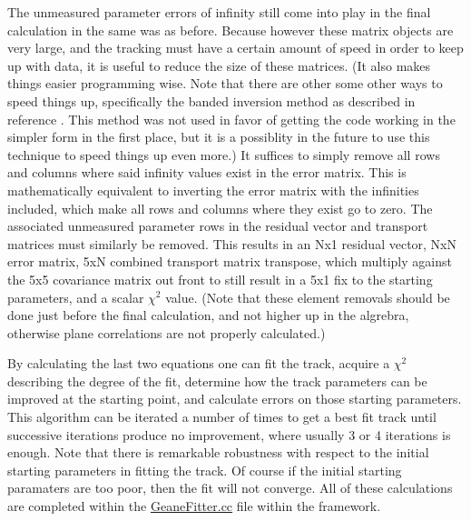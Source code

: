     The unmeasured parameter errors of infinity still come into play in the final calculation in the same was as before. Because however these matrix objects are very large, and the tracking must have a certain amount of speed in order to keep up with data, it is useful to reduce the size of these matrices. (It also makes things easier programming wise. Note that there are other some other ways to speed things up, specifically the banded inversion method as described in reference \cite{trajfit}. This method was not used in favor of getting the code working in the simpler form in the first place, but it is a possiblity in the future to use this technique to speed things up even more.) It suffices to simply remove all rows and columns where said infinity values exist in the error matrix. This is mathematically equivalent to inverting the error matrix with the infinities included, which make all rows and columns where they exist go to zero. The associated unmeasured parameter rows in the residual vector and transport matrices must similarly be removed. This results in an Nx1 residual vector, NxN error matrix, 5xN combined transport matrix transpose, which multiply against the 5x5 covariance matrix out front to still result in a 5x1 fix to the starting parameters, and a scalar $\chi^2$ value. (Note that these element removals should be done just before the final calculation, and not higher up in the algrebra, otherwise plane correlations are not properly calculated.)

    By calculating the last two equations one can fit the track, acquire a $\chi^{2}$ describing the degree of the fit, determine how the track parameters can be improved at the starting point, and calculate errors on those starting parameters. This algorithm can be iterated a number of times to get a best fit track until successive iterations produce no improvement, where usually 3 or 4 iterations is enough. Note that there is remarkable robustness with respect to the initial starting parameters in fitting the track. Of course if the initial starting paramaters are too poor, then the fit will not converge. All of these calculations are completed within the \hyperref[sec:GeaneFitter]{GeaneFitter.cc} file within the framework.
